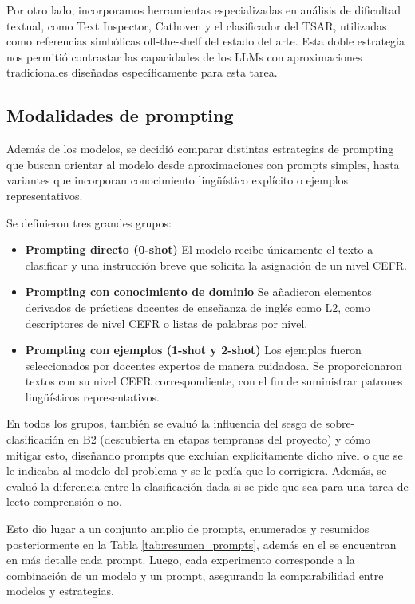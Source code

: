 Por otro lado, incorporamos herramientas especializadas en análisis de dificultad textual, como Text Inspector, Cathoven y el clasificador del TSAR, utilizadas como referencias simbólicas off-the-shelf del estado del arte. Esta doble estrategia nos permitió contrastar las capacidades de los LLMs con aproximaciones tradicionales diseñadas específicamente para esta tarea.

\subsection{Modalidades de prompting}\label{subsection:clas_prompt}
Además de los modelos, se decidió comparar distintas estrategias de prompting que buscan orientar al modelo desde aproximaciones con prompts simples, hasta variantes que incorporan conocimiento lingüístico explícito o ejemplos representativos.

Se definieron tres grandes grupos:
\begin{itemize}
    \item \textbf{Prompting directo (0-shot)}
    El modelo recibe únicamente el texto a clasificar y una instrucción breve que solicita la asignación de un nivel CEFR.

    \item \textbf{Prompting con conocimiento de dominio}
    Se añadieron elementos derivados de prácticas docentes de enseñanza de inglés como L2, como descriptores de nivel CEFR o listas de palabras por nivel.

    \item \textbf{Prompting con ejemplos (1-shot y 2-shot)}
    Los ejemplos fueron seleccionados por docentes expertos de manera cuidadosa. Se proporcionaron textos con su nivel CEFR correspondiente, con el fin de suministrar patrones lingüísticos representativos.
\end{itemize}

En todos los grupos, también se evaluó la influencia del sesgo de sobre-clasificación en B2 (descubierta en etapas tempranas del proyecto) y cómo mitigar esto, diseñando prompts que excluían explícitamente dicho nivel o que se le indicaba al modelo del problema y se le pedía que lo corrigiera. Además, se evaluó la diferencia entre la clasificación dada si se pide que sea para una tarea de lecto-comprensión o no.

Esto dio lugar a un conjunto amplio de prompts, enumerados y resumidos posteriormente en la Tabla \ref{tab:resumen_prompts}, además en el  se encuentran en más detalle cada prompt. Luego, cada experimento corresponde a la combinación de un modelo y un prompt, asegurando la comparabilidad entre modelos y estrategias.

